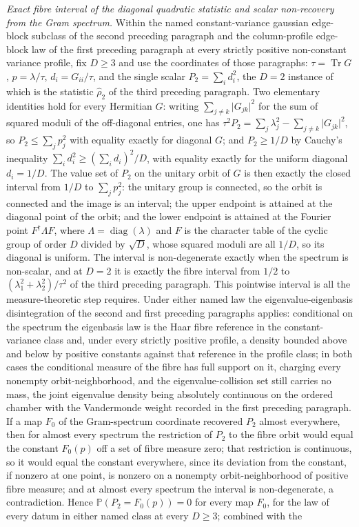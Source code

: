 \emph{Exact fibre interval of the diagonal quadratic statistic and scalar non-recovery from the Gram spectrum.} Within the named constant-variance gaussian edge-block subclass of the second preceding paragraph and the column-profile edge-block law of the first preceding paragraph at every strictly positive non-constant variance profile, fix \(D\ge3\) and use the coordinates of those paragraphs: \(\tau=\operatorname{Tr}G\), \(p=\lambda/\tau\), \(d_{i}=G_{ii}/\tau\), and the single scalar \(P_{2}=\sum_{i}d_{i}^{2}\), the \(D=2\) instance of which is the statistic \(\hat\rho_{2}\) of the third preceding paragraph. Two elementary identities hold for every Hermitian \(G\): writing \(\sum_{j\ne k}\lvert G_{jk}\rvert^{2}\) for the sum of squared moduli of the off-diagonal entries, one has \(\tau^{2}P_{2}=\sum_{j}\lambda_{j}^{2}-\sum_{j\ne k}\lvert G_{jk}\rvert^{2}\), so \(P_{2}\le\sum_{j}p_{j}^{2}\) with equality exactly for diagonal \(G\); and \(P_{2}\ge1/D\) by Cauchy's inequality \(\sum_{i}d_{i}^{2}\ge(\sum_{i}d_{i})^{2}/D\), with equality exactly for the uniform diagonal \(d_{i}=1/D\). The value set of \(P_{2}\) on the unitary orbit of \(G\) is then exactly the closed interval from \(1/D\) to \(\sum_{j}p_{j}^{2}\): the unitary group is connected, so the orbit is connected and the image is an interval; the upper endpoint is attained at the diagonal point of the orbit; and the lower endpoint is attained at the Fourier point \(F^{\dagger}\Lambda F\), where \(\Lambda=\operatorname{diag}(\lambda)\) and \(F\) is the character table of the cyclic group of order \(D\) divided by \(\sqrt{D}\), whose squared moduli are all \(1/D\), so its diagonal is uniform. The interval is non-degenerate exactly when the spectrum is non-scalar, and at \(D=2\) it is exactly the fibre interval from \(1/2\) to \((\lambda_{1}^{2}+\lambda_{2}^{2})/\tau^{2}\) of the third preceding paragraph. This pointwise interval is all the measure-theoretic step requires. Under either named law the eigenvalue-eigenbasis disintegration of the second and first preceding paragraphs applies: conditional on the spectrum the eigenbasis law is the Haar fibre reference in the constant-variance class and, under every strictly positive profile, a density bounded above and below by positive constants against that reference in the profile class; in both cases the conditional measure of the fibre has full support on it, charging every nonempty orbit-neighborhood, and the eigenvalue-collision set still carries no mass, the joint eigenvalue density being absolutely continuous on the ordered chamber with the Vandermonde weight recorded in the first preceding paragraph. If a map \(F_{0}\) of the Gram-spectrum coordinate recovered \(P_{2}\) almost everywhere, then for almost every spectrum the restriction of \(P_{2}\) to the fibre orbit would equal the constant \(F_{0}(p)\) off a set of fibre measure zero; that restriction is continuous, so it would equal the constant everywhere, since its deviation from the constant, if nonzero at one point, is nonzero on a nonempty orbit-neighborhood of positive fibre measure; and at almost every spectrum the interval is non-degenerate, a contradiction. Hence \(\mathbb{P}(P_{2}=F_{0}(p))=0\) for every map \(F_{0}\), for the law of every datum in either named class at every \(D\ge3\); combined with the 